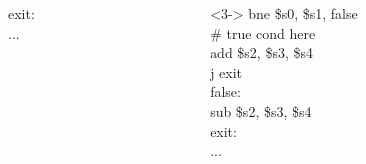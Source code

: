 \documentclass[
	10pt, %
	hmargin=1cm,vmargin=0cm,head=0.5cm,headsep=0pt,foot=0.5cm,margin=2cm
]{beamer}
\begin{document}
\begin{frame}[fragile]
\begin{columns}[c]
\begin{column}{0.3\textwidth}
			exit:  \\
			... \\
		\end{column}
		\begin{column}{0.3\textwidth}<3->
			\color{blue}bne \color{red}\$s0\color{black}, \color{red}\$s1\color{black}, false \\
			\# true cond here \\
			\color{blue}add \color{red}\$s2\color{black}, \color{red}\$s3\color{black}, \color{red}\$s4 \\
			\color{blue}j \color{black}exit \\
			false:  \\
			\color{blue}sub \color{red}\$s2\color{black}, \color{red}\$s3\color{black}, \color{red}\$s4\color{black} \\
			exit:  \\
			... \\
		\end{column}
	\end{columns}
\end{frame}
\end{document}
